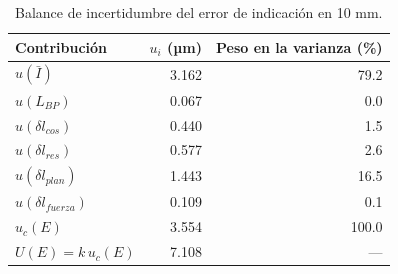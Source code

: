 \begin{table}[H]
\centering
\caption{Balance de incertidumbre del error de indicación en 10 mm.}
\label{tab:reloj-balance}
\begin{tabular}{lrr}
\toprule
Contribución & $u_i$ (µm) & Peso en la varianza (\%) \\
\midrule
$u(\bar I)$ & 3.162 & 79.2 \\
$u(L_{BP})$ & 0.067 & 0.0 \\
$u(\delta l_{cos})$ & 0.440 & 1.5 \\
$u(\delta l_{res})$ & 0.577 & 2.6 \\
$u(\delta l_{plan})$ & 1.443 & 16.5 \\
$u(\delta l_{fuerza})$ & 0.109 & 0.1 \\
$u_c(E)$ & 3.554 & 100.0 \\
$U(E)=k\,u_c(E)$ & 7.108 & --- \\
\bottomrule
\end{tabular}
\end{table}
